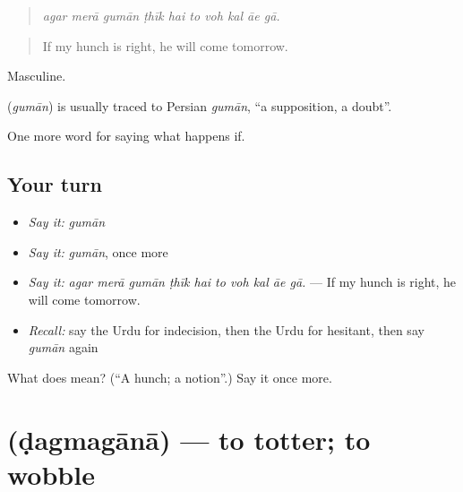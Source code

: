 \begin{quote}
         
\end{quote}

\begin{quote}
\emph{agar merā gumān ṭhīk hai to voh kal āe gā.}
\end{quote}

\begin{quote}
If my hunch is right, he will come tomorrow.
\end{quote}

Masculine.

\begin{cousinweb}
\textbf{} (\emph{gumān}) is usually traced to Persian \emph{gumān}, \textquotedblleft{}a supposition, a doubt\textquotedblright{}.
\end{cousinweb}

\begin{grammarlens}[title={What you've built}]
One more word for saying what happens if.
\end{grammarlens}

\subsection*{Your turn}
\begin{itemize}
\raggedright
  \item \emph{Say it:} \emph{gumān}
  \item \emph{Say it:} \emph{gumān}, once more
  \item \emph{Say it:} \emph{agar merā gumān ṭhīk hai to voh kal āe gā.} — If my hunch is right, he will come tomorrow.
  \item \emph{Recall:} say the Urdu for indecision, then the Urdu for hesitant, then say \emph{gumān} again
\end{itemize}

\begin{tcolorbox}[breakable,colback=teal!4,colframe=teal!35!black,title={Before you move on}]
What does  mean? (\textquotedblleft{}A hunch; a notion\textquotedblright{}.) Say it once more.
\end{tcolorbox}
\section[\texorpdfstring{\ur{ڈگمگانا} (ḍagmagānā)}{ڈگمگانا (ḍagmagānā)}]{ (ḍagmagānā) — to totter; to wobble}

